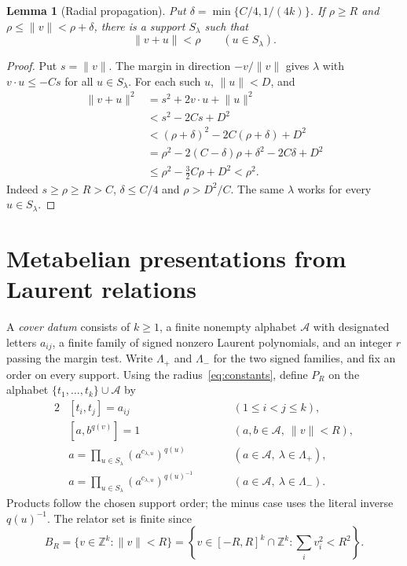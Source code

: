 \documentclass[12pt]{article}
\numberwithin{equation}{section}
\newtheorem{lemma}[theorem]{Lemma}
\theoremstyle{definition}
\theoremstyle{remark}
\newcommand{\Z}{\mathbb Z}
\newcommand{\norm}[1]{\lVert #1\rVert}
\begin{document}
\begin{lemma}[Radial propagation]
\label{lem:shrink}
Put $\delta=\min\{C/4,1/(4k)\}$. If $\rho\ge R$ and
$\rho\le\norm v<\rho+\delta$, there is a support $S_\lambda$ such that
\[
 \norm{v+u}<\rho \qquad(u\in S_\lambda).
\]
\end{lemma}

\begin{proof}
Put $s=\norm v$. The margin in direction $-v/\norm v$ gives
$\lambda$ with $v\cdot u\le-Cs$ for all $u\in S_\lambda$.
For each such $u$, $\norm u<D$, and
\begin{align*}
 \norm{v+u}^2
 &=s^2+2v\cdot u+\norm u^2\\
 &<s^2-2Cs+D^2\\
 &<(\rho+\delta)^2-2C(\rho+\delta)+D^2\\
 &=\rho^2-2(C-\delta)\rho+\delta^2-2C\delta+D^2\\
 &\le\rho^2-\tfrac32 C\rho+D^2
 <\rho^2.
\end{align*}
Indeed $s\ge\rho\ge R>C$, $\delta\le C/4$ and $\rho>D^2/C$.
The same $\lambda$ works for every $u\in S_\lambda$.
\end{proof}

\section{Metabelian presentations from Laurent relations}
\label{sec:covers}

A \emph{cover datum} consists of $k\ge1$, a finite nonempty alphabet
$\mathcal A$ with designated letters $a_{ij}$, a finite family of signed
nonzero Laurent polynomials, and an integer $r$ passing the margin test.
Write $\Lambda_+$ and $\Lambda_-$ for the two signed families, and
fix an order on every support. Using the radius~\eqref{eq:constants},
define $P_R$ on the alphabet $\{t_1,\ldots,t_k\}\cup\mathcal A$ by
\begin{alignat}{2}
 &[t_i,t_j]=a_{ij}
   &\qquad &(1\le i<j\le k), \label{eq:cover-t}\\[3pt]
 &[a,b^{q(v)}]=1
   &\qquad &(a,b\in\mathcal A,\ \norm v<R), \label{eq:cover-short}\\[3pt]
 &a=\prod_{u\in S_\lambda}(a^{c_{\lambda,u}})^{q(u)}
   &\qquad &(a\in\mathcal A,\ \lambda\in\Lambda_+), \label{eq:cover-plus}\\[3pt]
 &a=\prod_{u\in S_\lambda}(a^{c_{\lambda,u}})^{q(u)^{-1}}
   &\qquad &(a\in\mathcal A,\ \lambda\in\Lambda_-). \label{eq:cover-minus}
\end{alignat}
Products follow the chosen support order; the minus case uses the
literal inverse $q(u)^{-1}$. The relator set is finite since
\[
 B_R=\{v\in\Z^k:\norm v<R\}
 =\left\{v\in[-R,R]^k\cap\Z^k:\sum_i v_i^2<R^2\right\}.
\]
\end{document}
